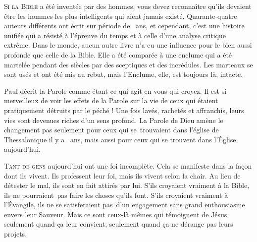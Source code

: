 \lettrine{S}{i la Bible} a été inventée par des hommes, vous devez reconnaître
 qu'ils devaient être les hommes les plus intelligents qui aient jamais existé.
 Quarante-quatre auteurs différents ont écrit
 sur période de ~ans, et cependant, c'est une histoire unifiée
 qui a résisté à l'épreuve du temps et à celle d'une analyse critique extrême.
 Dans le monde, aucun autre livre n'a eu une influence pour le bien aussi
 profonde que celle de la Bible. Elle a été comparée à une enclume
 qui a été martelée pendant des siècles par des sceptiques et des incrédules.
 Les marteaux se sont usés et ont été mis au rebut, mais l'Enclume,
 elle, est toujours là, intacte.


Paul décrit la Parole comme étant ce qui \og agit en vous qui croyez. \fg{}
 Il est si merveilleux de voir les effets de la Parole sur la vie
 de ceux qui étaient pratiquement détruits par le péché !
 Une fois lavés, rachetés et affranchis, leurs vies sont devenues
 riches d'un sens profond. La Parole de Dieu amène le changement
 \ocadr pas seulement pour ceux qui se~trouvaient dans l'église
 de Thessalonique il y a ~ans, mais aussi pour ceux
 qui se trouvent dans l'Église  aujourd'hui.

\dvrule






\lettrine{T}{ant de gens} aujourd'hui ont une foi incomplète.
 Cela se manifeste dans la façon dont ils vivent. Ils professent leur foi,
 mais ils vivent selon la chair. Au lieu de détester le mal,
 ils sont en fait attirés par lui. S'ils croyaient vraiment à la Bible,
 ils ne pourraient~pas faire les choses qu'ils font.
 S'ils croyaient vraiment à l'Évangile, ils ne se satisferaient pas~d'un
 engagement sans grand enthousiasme envers leur Sauveur.
 Mais ce sont ceux-là mêmes qui témoignent de Jésus seulement
 quand ça leur convient, seulement quand ça ne dérange pas leurs projets.

